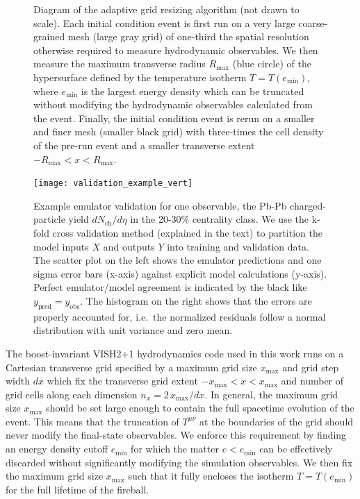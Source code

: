 \documentclass[aps,prc,reprint,amsmath,nofootinbib]{revtex4-1}
\newcommand{\nch}{N_\text{ch}}
\begin{document}
\begin{figure}[b]
  \caption{
    \label{fig:adaptive_grid}
    Diagram of the adaptive grid resizing algorithm (not drawn to scale).
    Each initial condition event is first run on a very large coarse-grained mesh (large gray grid) of one-third the spatial resolution otherwise required to measure hydrodynamic observables.
    We then measure the maximum transverse radius $R_\text{max}$ (blue circle) of the hypersurface defined by the temperature isotherm $T = T(e_\text{min})$, where $e_\text{min}$ is the largest energy density which can be truncated without modifying the hydrodynamic observables calculated from the event.
    Finally, the initial condition event is rerun on a smaller and finer mesh (smaller black grid) with three-times the cell density of the pre-run event and a smaller transverse extent $-R_\text{max} < x < R_\text{max}$.
  }
\end{figure}

\begin{figure}
  \texttt{[image: validation\_example\_vert]}
  \caption{
    \label{fig:validation_example}
    Example emulator validation for one observable, the Pb-Pb charged-particle yield $d\nch/d\eta$ in the 20-30\% centrality class.
    We use the k-fold cross validation method (explained in the text) to partition the model inputs $X$ and outputs $Y$ into training and validation data.
    The scatter plot on the left shows the emulator predictions and one sigma error bars (x-axis) against explicit model calculations (y-axis).
    Perfect emulator/model agreement is indicated by the black like $y_\text{pred}=y_\text{obs}$.
    The histogram on the right shows that the errors are properly accounted for, i.e.\ the normalized residuals follow a normal distribution with unit variance and zero mean.
  }
\end{figure}

The boost-invariant VISH2+1 hydrodynamics code used in this work \cite{Song:2007ux, Shen:2014vra} runs on a Cartesian transverse grid specified by a maximum grid size $x_\text{max}$ and grid step width $dx$ which fix the transverse grid extent ${-x_\text{max} < x < x_\text{max}}$ and number of grid cells along each dimension ${n_x = 2\, x_\text{max} / dx}$.
In general, the maximum grid size $x_\text{max}$ should be set large enough to contain the full spacetime evolution of the event.
This means that the truncation of $T^{\mu\nu}$ at the boundaries of the grid should never modify the final-state observables.
We enforce this requirement by finding an energy density cutoff $e_\text{min}$ for which the matter $e < e_\text{min}$ can be effectively discarded without significantly modifying the simulation observables.
We then fix the maximum grid size $x_\text{max}$ such that it fully encloses the isotherm $T=T(e_\text{min})$ for the full lifetime of the fireball.
\end{document}
